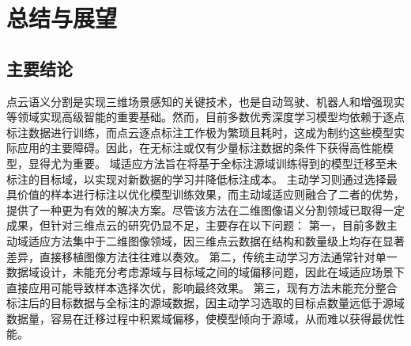 \chapter{总结与展望}
\thispagestyle{others}
\pagestyle{others}
\xiaosi

\section{主要结论}
点云语义分割是实现三维场景感知的关键技术，也是自动驾驶、机器人和增强现实等领域实现高级智能的重要基础。然而，目前多数优秀深度学习模型均依赖于逐点标注数据进行训练，而点云逐点标注工作极为繁琐且耗时，这成为制约这些模型实际应用的主要障碍。因此，在无标注或仅有少量标注数据的条件下获得高性能模型，显得尤为重要。
域适应方法旨在将基于全标注源域训练得到的模型迁移至未标注的目标域，以实现对新数据的学习并降低标注成本。
主动学习则通过选择最具价值的样本进行标注以优化模型训练效果，而主动域适应则融合了二者的优势，提供了一种更为有效的解决方案。尽管该方法在二维图像语义分割领域已取得一定成果，但针对三维点云的研究仍显不足，主要存在以下问题：
第一，目前多数主动域适应方法集中于二维图像领域，因三维点云数据在结构和数量级上均存在显著差异，直接移植图像方法往往难以奏效。
第二，传统主动学习方法通常针对单一数据域设计，未能充分考虑源域与目标域之间的域偏移问题，因此在域适应场景下直接应用可能导致样本选择次优，影响最终效果。
第三，现有方法未能充分整合标注后的目标数据与全标注的源域数据，因主动学习选取的目标点数量远低于源域数据量，容易在迁移过程中积累域偏移，使模型倾向于源域，从而难以获得最优性能。

